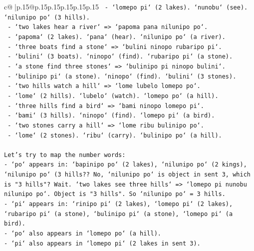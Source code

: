 \documentclass{article}
\begin{document}
{\begin{supertabular}{c@{$\;$}|p{.15\linewidth}@{}p{.15\linewidth}p{.15\linewidth}p{.15\linewidth}p{.15\linewidth}p{.15\linewidth}}
{{{\texttt{                       {-} `lomepo pi` (2 lakes). `nunobu` (see). `nilunipo po` (3 hills).} \\
\texttt{                     {-} `two lakes hear a river` => `papoma pana nilunipo po`.} \\
\texttt{                       {-} `papoma` (2 lakes). `pana` (hear). `nilunipo po` (a river).} \\
\texttt{                     {-} `three boats find a stone` => `bulini ninopo rubaripo pi`.} \\
\texttt{                       {-} `bulini` (3 boats). `ninopo` (find). `rubaripo pi` (a stone).} \\
\texttt{                     {-} `a stone find three stones` => `bulinipo pi ninopo bulini`.} \\
\texttt{                       {-} `bulinipo pi` (a stone). `ninopo` (find). `bulini` (3 stones).} \\
\texttt{                     {-} `two hills watch a hill` => `lome lubelo lomepo po`.} \\
\texttt{                       {-} `lome` (2 hills). `lubelo` (watch). `lomepo po` (a hill).} \\
\texttt{                     {-} `three hills find a bird` => `bami ninopo lomepo pi`.} \\
\texttt{                       {-} `bami` (3 hills). `ninopo` (find). `lomepo pi` (a bird).} \\
\texttt{                     {-} `two stones carry a hill` => `lome ribu bulinipo po`.} \\
\texttt{                       {-} `lome` (2 stones). `ribu` (carry). `bulinipo po` (a hill).} \\
\\ 
\texttt{Let's try to map the number words:} \\
\texttt{{-} `po` appears in: `bapinipo po` (2 lakes), `nilunipo po` (2 kings), `nilunipo po` (3 hills?? No, `nilunipo po` is object in sent 3, which is "3 hills"? Wait. `two lakes see three hills` => `lomepo pi nunobu nilunipo po`. Object is "3 hills". So `nilunipo po` = 3 hills.} \\
\texttt{{-} `pi` appears in: `rinipo pi` (2 lakes), `lomepo pi` (2 lakes), `rubaripo pi` (a stone), `bulinipo pi` (a stone), `lomepo pi` (a bird).} \\
\texttt{{-} `po` also appears in `lomepo po` (a hill).} \\
\texttt{{-} `pi` also appears in `lomepo pi` (2 lakes in sent 3).} \\
}}}
\end{supertabular}}
\end{document}
